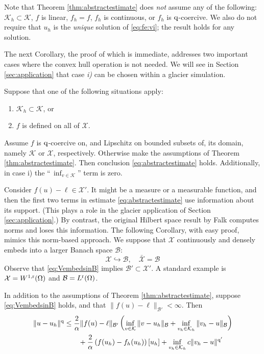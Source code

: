 \documentclass[hidelinks,onefignum,onetabnum,final]{siamart220329}  %
\newcommand{\cB}{\mathcal{B}}
\newcommand{\cK}{\mathcal{K}}
\newcommand{\cX}{\mathcal{X}}
\newcommand{\qq}{{\text{\textnormal{q}}}}
\newcommand{\rr}{{\text{\textnormal{r}}}}
\begin{document}
Note that Theorem \ref{thm:abstractestimate} does \emph{not} assume any of the following: $\cK_h \subset \cK$, $f$ is linear, $f_h=f$, $f_h$ is continuous, or $f_h$ is $\qq$-coercive.  We also do not require that $u_h$ is the \emph{unique} solution of \eqref{eq:fe:vi}; the result holds for any solution.

The next Corollary, the proof of which is immediate, addresses two important cases where the convex hull operation is not needed.  We will see in Section \ref{sec:application} that case \emph{i)} can be chosen within a glacier simulation.

\begin{corollary}  \label{cor:abstractestimate:nohull}  Suppose that one of the following situations apply:
\renewcommand{\labelenumi}{\roman{enumi})}
\begin{enumerate}
\item $\cK_h \subset \cK$, or
\item $f$ is defined on all of $\cX$.
\end{enumerate}
Assume $f$ is $\qq$-coercive on, and Lipschitz on bounded subsets of, its domain, namely $\cK$ or $\cX$, respectively.  Otherwise make the assumptions of Theorem \ref{thm:abstractestimate}.  Then conclusion \eqref{eq:abstractestimate} holds.  Additionally, in case i) the ``\,$\inf_{v\in\cK}$'' term is zero.
\end{corollary}

Consider $f(u)-\ell\in \cX'$.  It might be a measure or a measurable function, and then the first two terms in estimate \eqref{eq:abstractestimate} use information about its support.  (This plays a role in the glacier application of Section \ref{sec:application}.)  By contrast, the original Hilbert space result by Falk \cite{Falk1974} computes norms and loses this information.  The following Corollary, with easy proof, mimics this norm-based approach.  We suppose that $\cX$ continuously and densely embeds into a larger Banach space $\cB$:
\begin{equation}
\cX \hookrightarrow \cB, \quad \bar{\cX} = \cB \label{eq:VembedsinB}
\end{equation}
Observe that \eqref{eq:VembedsinB} implies $\cB' \subset \cX'$.  A standard example is $\cX=W^{1,\rr}(\Omega)$ and $\cB=L^\rr(\Omega)$.

\begin{corollary}  \label{cor:abstractestimate:Bnorm}  In addition to the assumptions of Theorem \ref{thm:abstractestimate}, suppose \eqref{eq:VembedsinB} holds, and that $\|f(u)-\ell\|_{\cB'} < \infty$.  Then
\begin{align}
\|u-u_h\|^\qq &\le \frac{2}{\alpha} \|f(u)-\ell\|_{\cB'} \left( \inf_{v\in\cK} \|v-u_h\|_{\cB} +   \inf_{v_h\in\cK_h} \|v_h-u\|_{\cB} \right) \label{eq:abstractestimate:Bnorm} \\
   &\qquad + \frac{2}{\alpha} \left(f(u_h)-f_h(u_h)\right)[u_h] + \inf_{v_h\in\cK_h} c \|v_h - u\|^{\qq'} \notag
\end{align}
\end{corollary}
\end{document}
